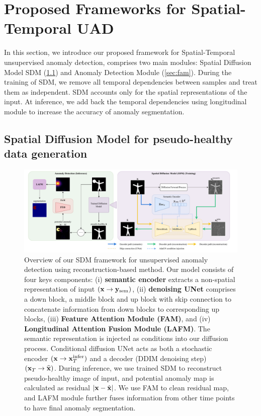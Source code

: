 \chapter{Proposed Frameworks for Spatial-Temporal UAD}
\label{chap:sdm}

In this section, we introduce our proposed framework for Spatial-Temporal unsupervised anomaly detection, comprises two main modules: Spatial Diffusion Model \ac{SDM} (\cref{sec:sdm}) and Anomaly Detection Module (\cref{sec:fam}). During the training of \ac{SDM}, we remove all temporal dependencies between samples and treat them as independent. \ac{SDM} accounts only for the spatial representations of the input. At inference, we add back the temporal dependencies using longitudinal module to increase the accuracy of anomaly segmentation. 

\minitoc

\section{Spatial Diffusion Model for pseudo-healthy data generation}
\label{sec:sdm}

\begin{figure}[htbp]
    \centering
    \includegraphics[width=1\linewidth]{figures/model-sdm.pdf}
    \caption[Overview of Spatial-Temporal UAD framework]{Overview of our \ac{SDM} framework for unsupervised anomaly detection using reconstruction-based method. Our model consists of four keys components: (i) \textbf{semantic encoder} extracts a non-spatial representation of input $({\mathbf{x}} \to {\mathbf{y}}_{\text{sem}})$, (ii) \textbf{denoising UNet} comprises a down block, a middle block and up block with skip connection to concatenate information from down blocks to corresponding up blocks, (iii) \textbf{Feature Attention Module (FAM)}, and (iv) \textbf{Longitudinal Attention Fusion Module (LAFM)}. The semantic representation is injected as conditions into our diffusion process. Conditional diffusion UNet acts as both a stochastic encoder $({\mathbf{x}} \to {\mathbf{x}}_T^{\text{infer}})$ and a decoder (DDIM denoising step) $({\mathbf{x}}_T \to \widehat{{\mathbf{x}}})$. During inference, we use trained SDM to reconstruct pseudo-healthy image of input, and potential anomaly map is calculated as residual $|{\mathbf{x}} - \hat{{\mathbf{x}}}|$. We use \ac{FAM} to clean residual map, and \ac{LAFM} module further fuses information from other time points to have final anomaly segmentation.} 
    \label{fig:model-sdm}
\end{figure}

